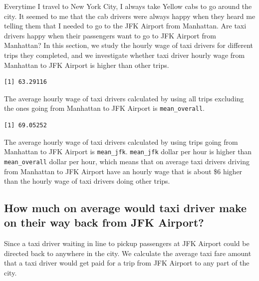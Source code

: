 \documentclass[12pt,twoside]{reedthesis}
\theoremstyle{definition}
\theoremstyle{definition}
\theoremstyle{definition}
\theoremstyle{remark}
\begin{document}
Everytime I travel to New York City, I always take Yellow cabs to go
around the city. It seemed to me that the cab drivers were always happy
when they heard me telling them that I needed to go to the JFK Airport
from Manhattan. Are taxi drivers happy when their passengers want to go
to JFK Airport from Manhattan? In this section, we study the hourly wage
of taxi drivers for different trips they completed, and we investigate
whether taxi driver hourly wage from Manhattan to JFK Airport is higher
than other trips.
\begin{verbatim}
[1] 63.29116
\end{verbatim}
The average hourly wage of taxi drivers calculated by using all trips
excluding the ones going from Manhattan to JFK Airport is
\texttt{mean\_overall}.
\begin{verbatim}
[1] 69.05252
\end{verbatim}
The average hourly wage of taxi drivers calculated by using trips going
from Manhattan to JFK Airport is \texttt{mean\_jfk}. \texttt{mean\_jfk}
dollar per hour is higher than \texttt{mean\_overall} dollar per hour,
which means that on average taxi drivers driving from Manhattan to JFK
Airport have an hourly wage that is about \$6 higher than the hourly
wage of taxi drivers doing other trips.

\subsection{How much on average would taxi driver make on their way back
from JFK
Airport?}\label{how-much-on-average-would-taxi-driver-make-on-their-way-back-from-jfk-airport}

Since a taxi driver waiting in line to pickup passengers at JFK Airport
could be directed back to anywhere in the city. We calculate the average
taxi fare amount that a taxi driver would get paid for a trip from JFK
Airport to any part of the city.
\end{document}
